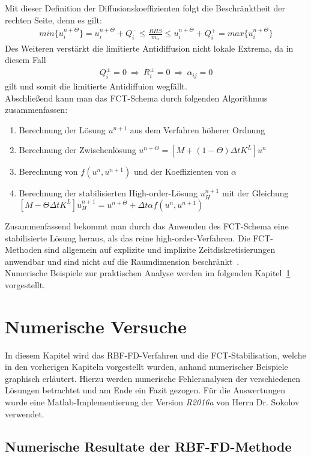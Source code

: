 \documentclass[12pt,titlepage]{article}
\begin{document}
Mit dieser Definition der Diffusionskoeffizienten folgt die Beschränktheit der rechten Seite, denn es gilt:
\begin{align}
 min\{u_i^{n+\Theta}\}=u_i^{n+\Theta}+Q_i^-\le\frac{RHS}{m_{ii}}\le u_i^{n+\Theta}+Q_i^+=max\{u_i^{n+\Theta}\}
\end{align}
Des Weiteren verstärkt die limitierte Antidiffusion nicht lokale Extrema, da in diesem Fall
\begin{align}
 Q_i^\pm=0~\Rightarrow~ R_i^\pm=0~\Rightarrow~\alpha_{ij}=0
\end{align}
gilt und somit die limitierte Antidiffuion wegfällt.\\
Abschließend kann man das FCT-Schema durch folgenden Algorithmus zusammenfassen:
\begin{enumerate}
 \item Berechnung der Lösung $u^{n+1}$ aus dem Verfahren höherer Ordnung
 \item Berechnung der Zwischenlösung $u^{n+\Theta}=[M+(1-\Theta)\Delta tK^L]u^n$
 \item Berechnung von $f(u^n,u^{n+1})$ und der Koeffizienten von $\alpha$
 \item Berechnung der stabilisierten High-order-Lösung $u_H^{n+1}$ mit der Gleichung $[M-\Theta\Delta tK^L]u_H^{n+1}=u^{n+\Theta}+\Delta t\alpha f(u^n,u^{n+1})$
\end{enumerate}
Zusammenfassend bekommt man durch das Anwenden des FCT-Schema eine stabilisierte Lösung heraus, als das reine high-order-Verfahren. Die FCT-Methoden sind allgemein auf explizite und implizite Zeitdiskretisierungen anwendbar und sind nicht auf die Raumdimension beschränkt~\cite{kuzmin2002flux}.\\ Numerische Beispiele zur praktischen Analyse werden im folgenden Kapitel~\ref{sec:NumVers} vorgestellt. 
\pagebreak
\section{Numerische Versuche}\label{sec:NumVers}
In diesem Kapitel wird das RBF-FD-Verfahren und die FCT-Stabilisation, welche in den vorherigen Kapiteln vorgestellt wurden, anhand numerischer Beispiele graphisch erläutert. Hierzu werden numerische Fehleranalysen der verschiedenen Lösungen betrachtet und am Ende ein Fazit gezogen. Für die Auswertungen wurde eine Matlab-Implementierung der Version \textit{R2016a} von Herrn Dr. Sokolov verwendet.
\subsection{Numerische Resultate der RBF-FD-Methode}
\end{document}
